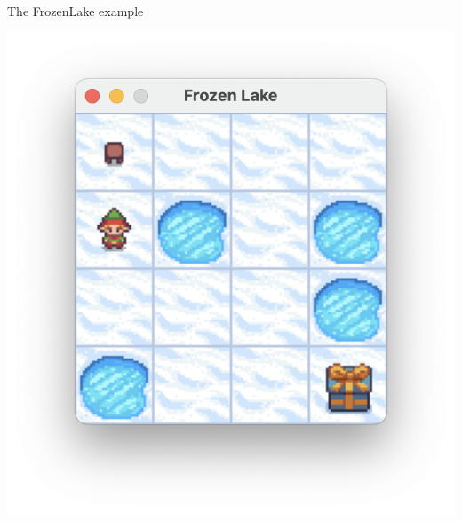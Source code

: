 \documentclass[aspectratio=169,xcolor=dvipsnames]{beamer}
\begin{document}

\begin{frame}{The FrozenLake example}

    \centering
    \includegraphics[scale=0.6]{images/single-agent.png}

\end{frame}

\end{document}
